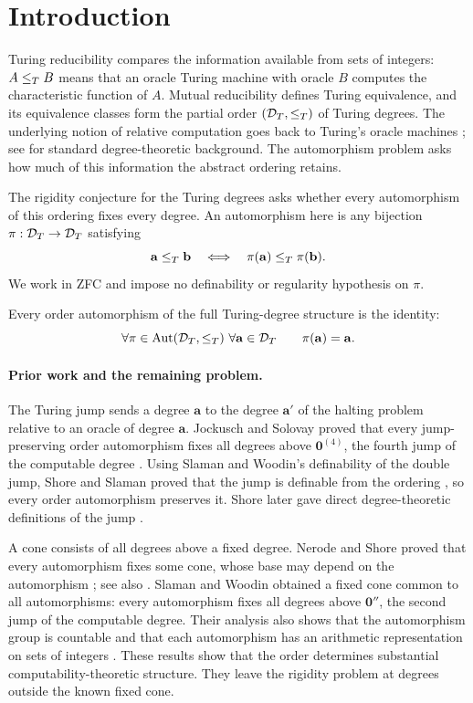 \section{Introduction}\label{sec:introduction}

Turing reducibility compares the information available from sets of
integers: $A\le_T B$ means that an oracle Turing machine with oracle $B$
computes the characteristic function of $A$. Mutual reducibility
defines Turing equivalence, and its equivalence classes form the
partial order $(\mathcal D_T,\le_T)$ of Turing degrees. The underlying notion
of relative computation goes back to Turing's oracle machines
\cite[Section~4]{Turing1939}; see \cite{Soare1987} for standard
degree-theoretic background. The automorphism problem asks how much
of this information the abstract ordering retains.

The rigidity conjecture for the Turing degrees asks whether every
automorphism of this ordering fixes every degree.
An automorphism here is any bijection
$\pi:\mathcal D_T\to\mathcal D_T$ satisfying
\[
\mathbf a\le_T\mathbf b
\quad\Longleftrightarrow\quad
\pi(\mathbf a)\le_T\pi(\mathbf b).
\]
We work in ZFC and impose no definability or regularity hypothesis
on $\pi$.

\begin{theorem}\label{thm:rigidity}
Every order automorphism of the full Turing-degree structure is
the identity:
\[
\forall\pi\in\operatorname{Aut}(\mathcal D_T,\le_T)\ \forall\mathbf a\in\mathcal D_T
\qquad \pi(\mathbf a)=\mathbf a.
\]
\end{theorem}

\paragraph{Prior work and the remaining problem.}
The Turing jump sends a degree $\mathbf a$ to the degree
$\mathbf a'$ of the halting problem relative to an oracle of
degree $\mathbf a$. Jockusch and Solovay proved that every
jump-preserving order automorphism fixes all degrees above
$\mathbf0^{(4)}$, the fourth jump of the computable degree
\cite{JockuschSolovay1977}. Using Slaman and Woodin's definability
of the double jump, Shore and Slaman proved that the jump is
definable from the ordering
\cite{ShoreSlaman1999}, so every order automorphism preserves it.
Shore later gave direct degree-theoretic definitions of the jump
\cite{Shore2007}.

A cone consists of all degrees above a fixed degree. Nerode and
Shore proved that every automorphism fixes some cone, whose base
may depend on the automorphism \cite{NerodeShore1980}; see also
\cite[Theorem~3.2, author's version]{SlamanGlobal}.
Slaman and Woodin obtained a fixed cone common to all
automorphisms: every automorphism fixes all degrees above
$\mathbf0''$, the second jump of the computable degree.
Their analysis also shows that the automorphism group is
countable and that each automorphism has an arithmetic
representation on sets of integers
\cite{SlamanWoodin2005,SlamanGlobal}.
These results show that the order determines substantial
computability-theoretic structure. They leave the rigidity
problem at degrees outside the known fixed cone.

